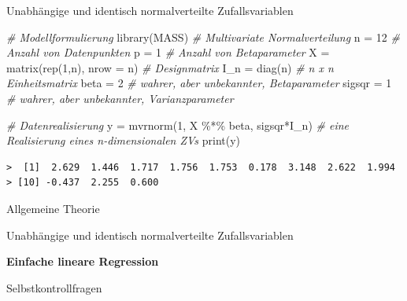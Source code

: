 \documentclass[
  8pt,
  ignorenonframetext,
]{beamer}
\newenvironment{Shaded}{\begin{snugshade}}{\end{snugshade}}
\newcommand{\AttributeTok}[1]{\textcolor[rgb]{0.77,0.63,0.00}{#1}}
\newcommand{\CommentTok}[1]{\textcolor[rgb]{0.56,0.35,0.01}{\textit{#1}}}
\newcommand{\DecValTok}[1]{\textcolor[rgb]{0.00,0.00,0.81}{#1}}
\newcommand{\FunctionTok}[1]{\textcolor[rgb]{0.00,0.00,0.00}{#1}}
\newcommand{\NormalTok}[1]{#1}
\newcommand{\OtherTok}[1]{\textcolor[rgb]{0.56,0.35,0.01}{#1}}
\newcommand{\SpecialCharTok}[1]{\textcolor[rgb]{0.00,0.00,0.00}{#1}}
\begin{document}
\begin{frame}[fragile]{Unabhängige und identisch normalverteilte
Zufallsvariablen}
\protect\hypertarget{unabhuxe4ngige-und-identisch-normalverteilte-zufallsvariablen-1}{}
\footnotesize

\begin{Shaded}
\begin{Highlighting}[]
\CommentTok{\# Modellformulierung}
\FunctionTok{library}\NormalTok{(MASS)                                }\CommentTok{\# Multivariate Normalverteilung}
\NormalTok{n      }\OtherTok{=} \DecValTok{12}                                  \CommentTok{\# Anzahl von Datenpunkten}
\NormalTok{p      }\OtherTok{=} \DecValTok{1}                                   \CommentTok{\# Anzahl von Betaparameter}
\NormalTok{X      }\OtherTok{=} \FunctionTok{matrix}\NormalTok{(}\FunctionTok{rep}\NormalTok{(}\DecValTok{1}\NormalTok{,n), }\AttributeTok{nrow =}\NormalTok{ n)          }\CommentTok{\# Designmatrix}
\NormalTok{I\_n    }\OtherTok{=} \FunctionTok{diag}\NormalTok{(n)                             }\CommentTok{\# n x n Einheitsmatrix}
\NormalTok{beta   }\OtherTok{=} \DecValTok{2}                                   \CommentTok{\# wahrer, aber unbekannter, Betaparameter}
\NormalTok{sigsqr }\OtherTok{=} \DecValTok{1}                                   \CommentTok{\# wahrer, aber unbekannter, Varianzparameter}

\CommentTok{\# Datenrealisierung}
\NormalTok{y      }\OtherTok{=} \FunctionTok{mvrnorm}\NormalTok{(}\DecValTok{1}\NormalTok{, X }\SpecialCharTok{\%*\%}\NormalTok{ beta, sigsqr}\SpecialCharTok{*}\NormalTok{I\_n)  }\CommentTok{\# eine Realisierung eines n{-}dimensionalen ZVs}
\FunctionTok{print}\NormalTok{(y)}
\end{Highlighting}
\end{Shaded}

\begin{verbatim}
>  [1]  2.629  1.446  1.717  1.756  1.753  0.178  3.148  2.622  1.994
> [10] -0.437  2.255  0.600
\end{verbatim}
\end{frame}

\begin{frame}{}
\protect\hypertarget{section-10}{}
\large
{}
\vfill

Allgemeine Theorie

Unabhängige und identisch normalverteilte Zufallsvariablen

\textbf{Einfache lineare Regression}

Selbstkontrollfragen \vfill
\end{frame}
\end{document}
